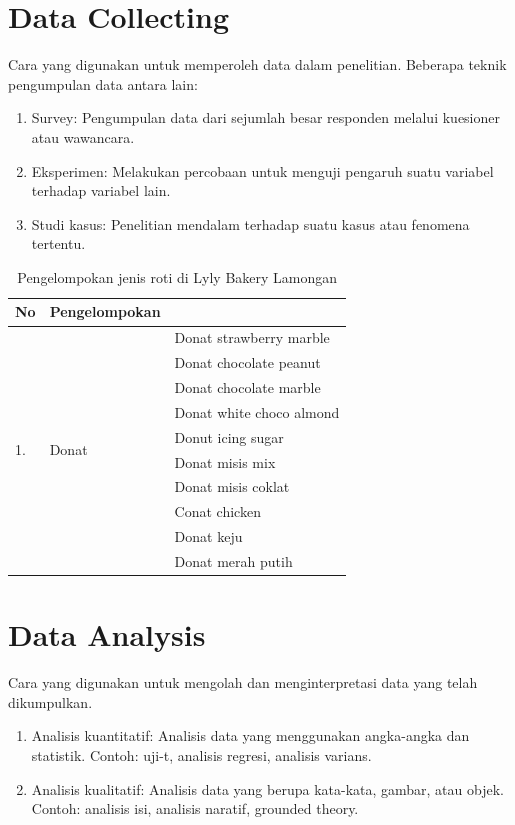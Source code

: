 \documentclass[english,12pt,a4paper]{book}
\begin{document}
\section{Data Collecting}
Cara yang digunakan untuk memperoleh data dalam penelitian. Beberapa teknik pengumpulan data antara lain:
\begin{enumerate}
	\item Survey: Pengumpulan data dari sejumlah besar responden melalui kuesioner atau wawancara.
	\item Eksperimen: Melakukan percobaan untuk menguji pengaruh suatu variabel terhadap variabel lain.
	\item Studi kasus: Penelitian mendalam terhadap suatu kasus atau fenomena tertentu.
\end{enumerate}
\begin{table}[h!]
	\centering
	\caption{Pengelompokan jenis roti di Lyly Bakery Lamongan}
	\begin{tabular}{|l|l|l|}
		\hline
		No                    & Pengelompokan                       &                               \\ \hline
		\multirow{10}{*}{1.}  & \multirow{10}{*}{Donat}             & Donat strawberry marble      \\ \cline{3-3} 
		&                                     & Donat chocolate peanut       \\ \cline{3-3} 
		&                                     & Donat chocolate marble       \\ \cline{3-3} 
		&                                     & Donat white choco almond     \\ \cline{3-3} 
		&                                     & Donut icing sugar            \\ \cline{3-3} 
		&                                     & Donat misis mix              \\ \cline{3-3} 
		&                                     & Donat misis coklat           \\ \cline{3-3} 
		&                                     & Conat chicken                \\ \cline{3-3} 
		&                                     & Donat keju                   \\ \cline{3-3} 
		&                                     & Donat merah putih            \\ \hline
	\end{tabular}
\end{table}
\section{Data Analysis}
Cara yang digunakan untuk mengolah dan menginterpretasi data yang telah dikumpulkan.
\begin{enumerate}
	\item Analisis kuantitatif: Analisis data yang menggunakan angka-angka dan statistik. Contoh: uji-t, analisis regresi, analisis varians.
	\item Analisis kualitatif: Analisis data yang berupa kata-kata, gambar, atau objek. Contoh: analisis isi, analisis naratif, grounded theory.
\end{enumerate}
\end{document}
